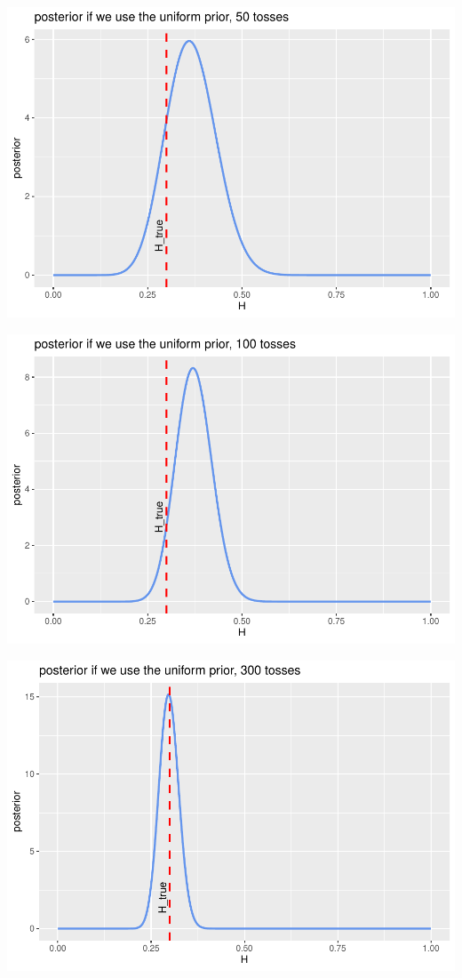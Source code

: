 \documentclass[
]{article}
\begin{document}
\begin{center}\includegraphics[width=0.75\linewidth]{astrostat-1_files/figure-latex/unnamed-chunk-4-1} \end{center}

\begin{center}\includegraphics[width=0.75\linewidth]{astrostat-1_files/figure-latex/unnamed-chunk-5-1} \end{center}

\begin{center}\includegraphics[width=0.75\linewidth]{astrostat-1_files/figure-latex/unnamed-chunk-6-1} \end{center}
\end{document}
